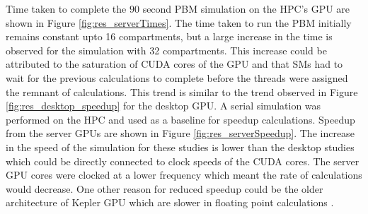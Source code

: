 \documentclass[preprint,10pt,authoryear,review]{elsarticle}
\begin{document}
Time taken to complete the $90$ second PBM simulation on the HPC's GPU are shown in 
Figure \ref{fig:res_serverTimes}. The time taken to run the PBM initially remains 
constant upto 16 compartments, but a large increase in the time is observed for the 
simulation with 32 compartments. This increase could be attributed to the saturation 
of CUDA cores of the GPU and that SMs had to wait for the previous calculations to 
complete before the threads were assigned the remnant of calculations. This trend 
is similar to the trend observed in Figure \ref{fig:res_desktop_speedup} for the 
desktop GPU. A serial simulation was performed on the HPC and used as a baseline 
for speedup calculations. Speedup from the server GPUs are shown in Figure 
\ref{fig:res_serverSpeedup}. The increase in the speed of the simulation for these 
studies is lower than the desktop studies which could be directly connected to clock 
speeds of the CUDA cores. The server GPU cores were clocked at a lower frequency 
which meant the rate of calculations would decrease. One other reason for reduced 
speedup could be the older architecture of Kepler GPU which are slower in floating 
point calculations \citep{Pascal2016}.
\end{document}
